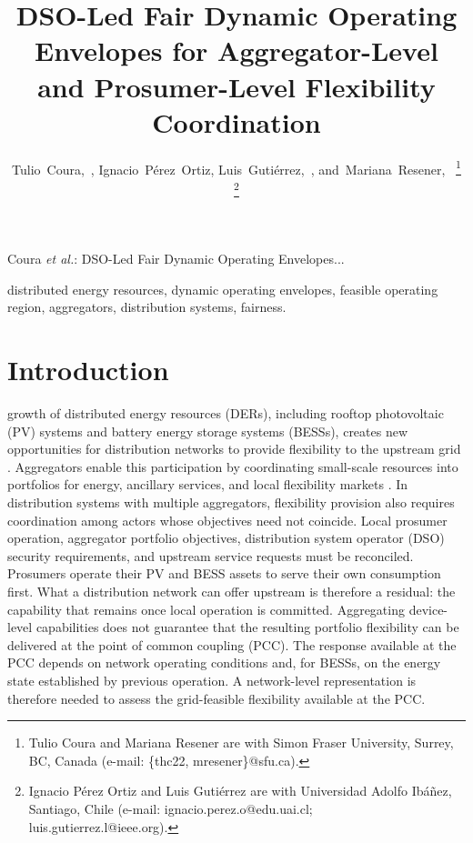 \documentclass[journal]{IEEEtran}
\title{DSO-Led Fair Dynamic Operating Envelopes for Aggregator-Level and Prosumer-Level Flexibility Coordination}
\author{
Tulio~Coura,~\IEEEmembership{Student~Member,~IEEE},
Ignacio~Pérez~Ortiz,
Luis~Gutiérrez,~\IEEEmembership{Member,~IEEE},
and~Mariana~Resener,~\IEEEmembership{Senior~Member,~IEEE}
%
\thanks{Tulio Coura and Mariana Resener are with Simon Fraser University,
Surrey, BC, Canada
(e-mail: \{thc22, mresener\}@sfu.ca).}
%
\thanks{Ignacio Pérez Ortiz and Luis Gutiérrez are with Universidad Adolfo
Ibáñez, Santiago, Chile
(e-mail: ignacio.perez.o@edu.uai.cl; luis.gutierrez.l@ieee.org).}
}
\begin{document}
%
{Coura \MakeLowercase{\textit{et al.}}: DSO-Led Fair Dynamic Operating Envelopes...}

\maketitle

\begin{abstract}
\end{abstract}

\begin{IEEEkeywords}
distributed energy resources, dynamic operating envelopes, feasible operating region, aggregators, distribution systems, fairness.
\end{IEEEkeywords}

\IEEEpeerreviewmaketitle

\section{Introduction}
\label{sec:introduction}

 growth of distributed energy resources (DERs), including rooftop photovoltaic (PV) systems and battery energy storage systems (BESSs), creates new opportunities for distribution networks to provide flexibility to the upstream grid \cite{iea2022}. Aggregators enable this participation by coordinating small-scale resources into portfolios for energy, ancillary services, and local flexibility markets \cite{carreiro2017,miah2026ancillary}. In distribution systems with multiple aggregators, flexibility provision also requires coordination among actors whose objectives need not coincide. Local prosumer operation, aggregator portfolio objectives, distribution system operator (DSO) security requirements, and upstream service requests must be reconciled. Prosumers operate their PV and BESS assets to serve their own consumption first. What a distribution network can offer upstream is therefore a residual: the capability that remains once local operation is committed. Aggregating device-level capabilities does not guarantee that the resulting portfolio flexibility can be delivered at the point of common coupling (PCC). The response available at the PCC depends on network operating conditions and, for BESSs, on the energy state established by previous operation. A network-level representation is therefore needed to assess the grid-feasible flexibility available at the PCC.
\end{document}
